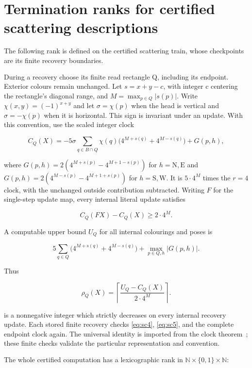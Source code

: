 \section{Termination ranks for certified scattering descriptions}\label{scattering-6}

The following rank is defined on the certified scattering train, whose
checkpoints are its finite recovery boundaries.

During a recovery choose its finite read rectangle Q, including its
endpoint. Exterior colours remain unchanged. Let $s=x+y-c$, with integer c
centering the rectangle's diagonal range, and $M=\max_{p\in Q}|s(p)|$. Write $\chi(x,y)=(-1)^{x+y}$ and let $\sigma=\chi(p)$ when the
head is vertical and $\sigma=-\chi(p)$ when it is horizontal. This sign is
invariant under an update. With this convention,
use the scaled integer clock

\[
C_Q(X)=-5\sigma\sum_{q\in B\cap Q}\chi(q)\bigl(4^{M+s(q)}+4^{M-s(q)}\bigr)+G(p,h),
\]

where $G(p,h)=2(4^{M+s(p)}-4^{M+1-s(p)})$ for $h=\mathrm N,\mathrm E$ and
$G(p,h)=2(4^{M-s(p)}-4^{M+1+s(p)})$ for $h=\mathrm S,\mathrm W$. It is $5\cdot4^M$ times the $r=4$
clock, with the unchanged outside contribution subtracted. Writing $F$ for the single-step update map, every
internal literal update satisfies

\begin{equation}\label{eq:sc4}
C_Q(FX)-C_Q(X)\ge2\cdot4^M.
\end{equation}

A computable upper bound $U_Q$ for all internal colourings and poses is

\[
5\sum_{q\in Q}\bigl(4^{M+s(q)}+4^{M-s(q)}\bigr)+\max_{p\in Q,h}|G(p,h)|.
\]

Thus

\begin{equation}\label{eq:sc5}
\rho_Q(X)=\left\lceil\frac{U_Q-C_Q(X)}{2\cdot4^M}\right\rceil.
\end{equation}

is a nonnegative integer which strictly decreases on every internal
recovery update. Each stored finite recovery checks \eqref{eq:sc4}, \eqref{eq:sc5}, and the
complete endpoint clock again. The universal identity is imported from
the clock theorem~\cite{clock2026}; these finite checks validate the particular
representation and convention.

The whole certified computation has a lexicographic rank in $\mathbb N\times\{0,1\}\times\mathbb N$:

